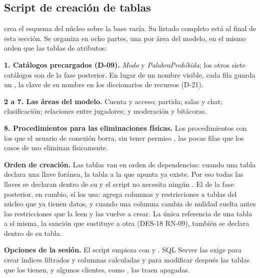 \subsection*{Script de creación de tablas}

 crea el esquema del núcleo sobre la base vacía. Su listado completo está al final de esta sección. Se organiza en ocho partes, una por área del modelo, en el mismo orden que las tablas de atributos:

\begin{reglas}
  \item \textbf{1. Catálogos precargados (\mbox{D-09}).} \textit{Modo} y \textit{PalabraProhibida}; los otros siete catálogos son de la fase posterior. En lugar de un nombre visible, cada fila guarda un , la clave de su nombre en los diccionarios de recursos (\mbox{D-21}).
  \item \textbf{2 a 7. Las áreas del modelo.} Cuenta y acceso; partida; salas y chat; clasificación; relaciones entre jugadores; y moderación y bitácoras.
  \item \textbf{8. Procedimientos para las eliminaciones físicas.} Los \bdNumProcedimientos{} procedimientos con los que el usuario de conexión borra, sin tener permiso , las pocas filas que los casos de uso eliminan físicamente.
\end{reglas}

\textbf{Orden de creación.} Las tablas van en orden de dependencias: cuando una tabla declara una llave foránea, la tabla a la que apunta ya existe. Por eso todas las llaves se declaran dentro de su  y el script no necesita ningún . El de la fase posterior, en cambio, sí los usa: agrega columnas y restricciones a tablas del núcleo que ya tienen datos, y cuando una columna cambia de nulidad suelta antes las restricciones que la leen y las vuelve a crear. La única referencia de una tabla a sí misma, la sanción que sustituye a otra (\mbox{DES-18} \mbox{RN-09}), también se declara dentro de su tabla.

\textbf{Opciones de la sesión.} El script empieza con  y . SQL Server las exige para crear índices filtrados y columnas calculadas y para modificar después las tablas que los tienen, y algunos clientes, como , las traen apagadas.

